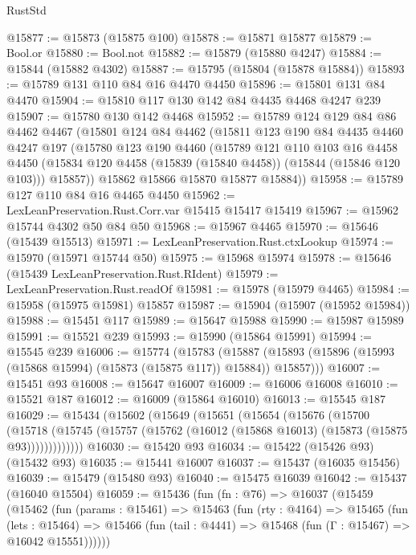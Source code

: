 \begin{lexlean}{RustStd}
\begin{coremodule}
@15877 := @15873 (@15875 @100)
@15878 := @15871 @15877
@15879 := Bool.or
@15880 := Bool.not
@15882 := @15879 (@15880 @4247)
@15884 := @15844 (@15882 @4302)
@15887 := @15795 (@15804 (@15878 @15884))
@15893 := @15789 @131 @110 @84 @16 @4470 @4450
@15896 := @15801 @131 @84 @4470
@15904 := @15810 @117 @130 @142 @84 @4435 @4468 @4247 @239
@15907 := @15780 @130 @142 @4468
@15952 := @15789
    @124
    @129
    @84
    @86
    @4462
    @4467
    (@15801
      @124
      @84
      @4462
      (@15811
        @123
        @190
        @84
        @4435
        @4460
        @4247
        @197
        (@15780
          @123
          @190
          @4460
          (@15789
            @121
            @110
            @103
            @16
            @4458
            @4450
            (@15834 @120 @4458 (@15839 (@15840 @4458)) (@15844 (@15846 @120 @103)))
            @15857))
        @15862
        @15866
        @15870
        @15877
        @15884))
@15958 := @15789 @127 @110 @84 @16 @4465 @4450
@15962 := LexLeanPreservation.Rust.Corr.var @15415 @15417 @15419
@15967 := @15962 @15744 @4302 @50 @84 @50
@15968 := @15967 @4465
@15970 := @15646 (@15439 @15513)
@15971 := LexLeanPreservation.Rust.ctxLookup
@15974 := @15970 (@15971 @15744 @50)
@15975 := @15968 @15974
@15978 := @15646 (@15439 LexLeanPreservation.Rust.RIdent)
@15979 := LexLeanPreservation.Rust.readOf
@15981 := @15978 (@15979 @4465)
@15984 := @15958 (@15975 @15981) @15857
@15987 := @15904 (@15907 (@15952 @15984))
@15988 := @15451 @117
@15989 := @15647 @15988
@15990 := @15987 @15989
@15991 := @15521 @239
@15993 := @15990 (@15864 @15991)
@15994 := @15545 @239
@16006 := @15774
    (@15783
      (@15887 (@15893 (@15896 (@15993 (@15868 @15994) (@15873 (@15875 @117)) @15884)) @15857)))
@16007 := @15451 @93
@16008 := @15647 @16007
@16009 := @16006 @16008
@16010 := @15521 @187
@16012 := @16009 (@15864 @16010)
@16013 := @15545 @187
@16029 := @15434
    (@15602
      (@15649
        (@15651
          (@15654
            (@15676
              (@15700
                (@15718
                  (@15745 (@15757 (@15762 (@16012 (@15868 @16013) (@15873 (@15875 @93)))))))))))))
@16030 := @15420 @93
@16034 := @15422 (@15426 @93) (@15432 @93)
@16035 := @15441 @16007
@16037 := @15437 (@16035 @15456)
@16039 := @15479 (@15480 @93)
@16040 := @15475 @16039
@16042 := @15437 (@16040 @15504)
@16059 := @15436
    (fun (fn : @76) =>
    @16037
      (@15459
        (@15462
          (fun (params : @15461) =>
          @15463
            (fun (rty : @4164) =>
            @15465
              (fun (lets : @15464) =>
              @15466 (fun (tail : @4441) => @15468 (fun (Γ : @15467) => @16042 @15551))))))

\end{coremodule}
\end{lexlean}
